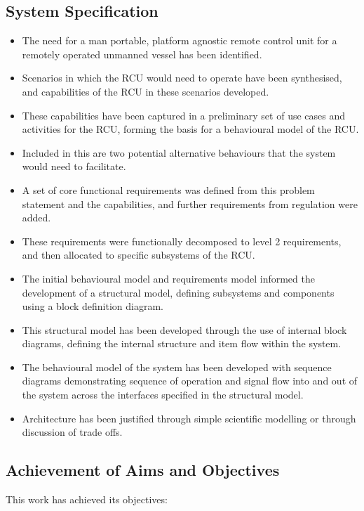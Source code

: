 \documentclass[../main.tex]{subfiles}
\begin{document}
    
\subsection{System Specification}
\begin{itemize}
    \item{} The need for a man portable, platform agnostic remote control unit for a remotely operated unmanned vessel has been identified.
    \item{} Scenarios in which the RCU would need to operate have been synthesised, and capabilities of the RCU in these scenarios developed.
    \item{} These capabilities have been captured in a preliminary set of use cases and activities for the RCU, forming the basis for a behavioural model of the RCU\@.
    \item{} Included in this are two potential alternative behaviours that the system would need to facilitate.
    \item{} A set of core functional requirements was defined from this problem statement and the capabilities, and further requirements from regulation were added.
    \item{} These requirements were functionally decomposed to level 2 requirements, and then allocated to specific subsystems of the RCU\@.
    \item{} The initial behavioural model and requirements model informed the development of a structural model, defining subsystems and components using a block definition diagram.
    \item{} This structural model has been developed through the use of internal block diagrams, defining the internal structure and item flow within the system.
    \item{} The behavioural model of the system has been developed with sequence diagrams demonstrating sequence of operation and signal flow into and out of the system across the interfaces specified in the structural model.
    \item{} Architecture has been justified through simple scientific modelling or through discussion of trade offs.
\end{itemize}

\subsection{Achievement of Aims and Objectives}

This work has achieved its objectives:
\end{document}
